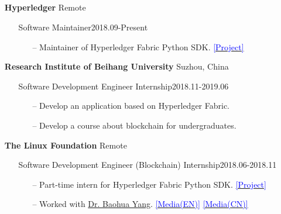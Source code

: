 \documentclass[11pt]{article}
\begin{document}
\subsection*{}
\begin{itemize}[leftmargin=0em, noitemsep, nolistsep]
    \setlength\itemsep{1em}
    \item[] \large\textbf{Hyperledger} \hfill Remote
        \begin{itemize}[noitemsep, nolistsep, leftmargin=0em]
            \item[] Software Maintainer\hfill 2018.09-Present
             \begin{itemize}
                \small
                \item[--] Maintainer of Hyperledger Fabric Python SDK. \href{https://github.com/hyperledger/fabric-sdk-py}{\textcolor{blue}{[Project]}}
             \end{itemize}
        \end{itemize} 
    \item[] \large\textbf{Research Institute of Beihang University} \hfill Suzhou, China
        \begin{itemize}[noitemsep, nolistsep, leftmargin=0em]
            \item[] Software Development Engineer Internship\hfill 2018.11-2019.06
             \begin{itemize}
                \small
                \item[--] Develop an application based on Hyperledger Fabric.
                \item[--] Develop a course about blockchain for undergraduates.
             \end{itemize}
        \end{itemize}
    \item[] \large\textbf{The Linux Foundation} \hfill Remote
        \begin{itemize}[noitemsep, nolistsep, leftmargin=0em]
            \item[] Software Development Engineer (Blockchain) Internship\hfill 2018.06-2018.11
             \begin{itemize}
                \small
                \item[--] Part-time intern for Hyperledger Fabric Python SDK. \href{https://github.com/hyperledger/fabric-sdk-py}{\textcolor{blue}{[Project]}}
                \item[--] Worked with \href{https://yeasy.github.io/}{Dr. Baohua Yang}. \href{https://www.hyperledger.org/blog/2018/06/13/meet-the-hyperledger-summer-2018-interns-part-2}{\textcolor{blue}{[Media(EN)]}} \href{https://archive.is/5nyBm}{\textcolor{blue}{[Media(CN)]}}
             \end{itemize}
        \end{itemize}
\end{itemize}
\end{document}
